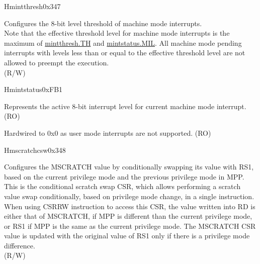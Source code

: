 \begin{register}{H}{mintthresh}{0x347}\label{regdesc:MINTTHRESH}
%
%
\regnewline%
\begin{regdesc}\begin{reglist}
\label{fielddesc:MINTTHRESH_TH}\item [TH] Configures the 8-bit level threshold of machine mode interrupts. \\
Note that the effective threshold level for machine mode interrupts is the maximum of \hyperref[fielddesc:MINTTHRESH_TH]{{mintthresh.TH}} and \hyperref[fielddesc:MINTSTATUS_MIL]{{mintstatus.MIL}}. All machine mode pending interrupts with levels less than or equal to the effective threshold level are not allowed to preempt the execution.\\(R/W)
\end{reglist}\end{regdesc}
\end{register}

\begin{register}{H}{mintstatus}{0xFB1}
\label{regdesc:MINTSTATUS}
%
%
%
\regnewline%
\begin{regdesc}\begin{reglist}
\label{fielddesc:MINTSTATUS_MIL}\item [MIL] Represents the active 8-bit interrupt level for current machine mode interrupt. (RO)
\label{fielddesc:MINTSTATUS_UIL}\item [UIL] Hardwired to 0x0 as user mode interrupts are not supported. (RO)
\end{reglist}\end{regdesc}
\end{register}


\begin{register}{H}{mscratchcsw}{0x348}\label{regdesc:MSCRATCHCSW_REG}
%
\regnewline%
\begin{regdesc}\begin{reglist}
\label{fielddesc:MSCRATCHCSW}\item [MSCRATCHCSW] Configures the MSCRATCH value by conditionally swapping its value with RS1, based on the current privilege mode and the previous privilege mode in MPP.\\
This is the conditional scratch swap CSR, which allows performing a scratch value swap conditionally, based on privilege mode change, in a single instruction.\\
When using CSRRW instruction to access this CSR, the value written into RD is either that of MSCRATCH, if MPP is different than the current privilege mode, or RS1 if MPP is the same as the current privilege mode. The MSCRATCH CSR value is updated with the original value of RS1 only if there is a privilege mode difference. \\
(R/W)
\end{reglist}\end{regdesc}
\end{register}

